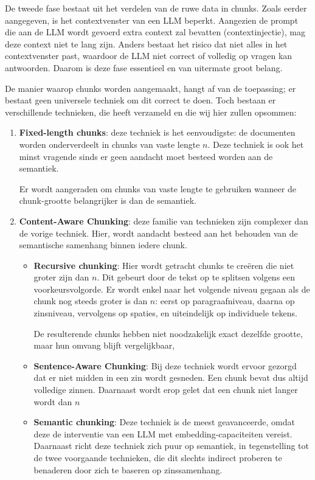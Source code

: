 De tweede fase bestaat uit het verdelen van de ruwe data in chunks. Zoals eerder aangegeven, is het contextvenster van een \acrshort{LLM} beperkt. Aangezien de prompt die aan de \acrshort{LLM} wordt gevoerd extra context zal bevatten (contextinjectie), mag deze context niet te lang zijn. Anders bestaat het risico dat niet alles in het contextvenster past, waardoor de \acrshort{LLM} niet correct of volledig op vragen kan antwoorden. Daarom is deze fase essentieel en van uitermate groot belang.

De manier waarop chunks worden aangemaakt, hangt af van de toepassing; er bestaat geen universele techniek om dit correct te doen. Toch bestaan er verschillende technieken, die \textcite{Kshirsagar2024} heeft verzameld en die wij hier zullen opsommen:

\begin{enumerate} 
    \item \textbf{Fixed-length chunks}: deze techniek is het eenvoudigste: de documenten worden onderverdeelt in chunks van vaste lengte $n$. Deze techniek is ook het minst vragende sinds er geen aandacht moet besteed worden aan de semantiek. 
    
    Er wordt aangeraden om chunks van vaste lengte te gebruiken wanneer de chunk-grootte belangrijker is dan de semantiek.
    \item \textbf{Content-Aware Chunking}: deze familie van technieken zijn complexer dan de vorige techniek. Hier, wordt aandacht besteed aan het behouden van de semantische samenhang binnen iedere chunk.
    
        \begin{itemize}
            \item \textbf{Recursive chunking}: Hier wordt getracht chunks te creëren die niet groter zijn dan $n$. Dit gebeurt door de tekst op te splitsen volgens een voorkeursvolgorde. Er wordt enkel naar het volgende niveau gegaan als de chunk nog steeds groter is dan $n$: eerst op paragraafniveau, daarna op zinsniveau, vervolgens op spaties, en uiteindelijk op individuele tekens.
            
            De resulterende chunks hebben niet noodzakelijk exact dezelfde grootte, maar hun omvang blijft vergelijkbaar,
            \item \textbf{Sentence-Aware Chunking}: Bij deze techniek wordt ervoor gezorgd dat er niet midden in een zin wordt gesneden. Een chunk bevat dus altijd volledige zinnen. Daarnaast wordt erop gelet dat een chunk niet langer wordt dan $n$
            \item \textbf{Semantic chunking}: Deze techniek is de meest geavanceerde, omdat deze de interventie van een LLM met embedding-capaciteiten vereist. Daarnaast richt deze techniek zich puur op semantiek, in tegenstelling tot de twee voorgaande technieken, die dit slechts indirect proberen te benaderen door zich te baseren op zinssamenhang. 
            

\end{itemize}
\end{enumerate}
